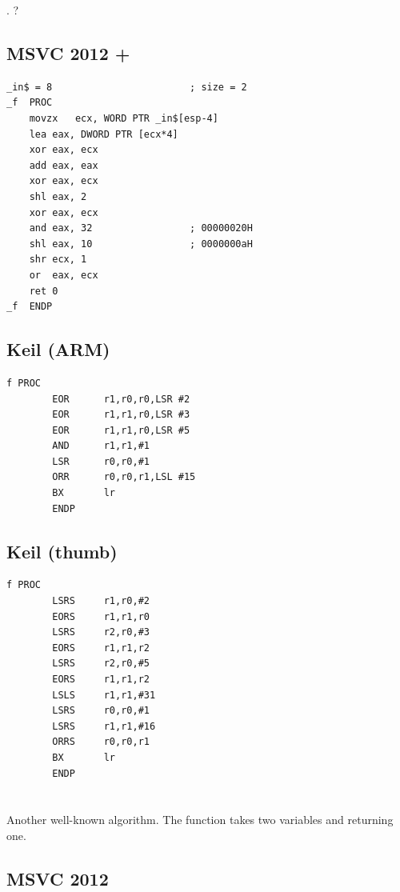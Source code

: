 .
?

\subsection{MSVC 2012 + \Ox}

\begin{lstlisting}
_in$ = 8						; size = 2
_f	PROC
	movzx	ecx, WORD PTR _in$[esp-4]
	lea	eax, DWORD PTR [ecx*4]
	xor	eax, ecx
	add	eax, eax
	xor	eax, ecx
	shl	eax, 2
	xor	eax, ecx
	and	eax, 32					; 00000020H
	shl	eax, 10					; 0000000aH
	shr	ecx, 1
	or	eax, ecx
	ret	0
_f	ENDP
\end{lstlisting}

\subsection{Keil (ARM)}

\begin{lstlisting}
f PROC
        EOR      r1,r0,r0,LSR #2
        EOR      r1,r1,r0,LSR #3
        EOR      r1,r1,r0,LSR #5
        AND      r1,r1,#1
        LSR      r0,r0,#1
        ORR      r0,r0,r1,LSL #15
        BX       lr
        ENDP
\end{lstlisting}

\subsection{Keil (thumb)}

\begin{lstlisting}
f PROC
        LSRS     r1,r0,#2
        EORS     r1,r1,r0
        LSRS     r2,r0,#3
        EORS     r1,r1,r2
        LSRS     r2,r0,#5
        EORS     r1,r1,r2
        LSLS     r1,r1,#31
        LSRS     r0,r0,#1
        LSRS     r1,r1,#16
        ORRS     r0,r0,r1
        BX       lr
        ENDP
\end{lstlisting}

\section{}

{Another well-known algorithm. The function takes two variables and returning one.}

\subsection{MSVC 2012}

